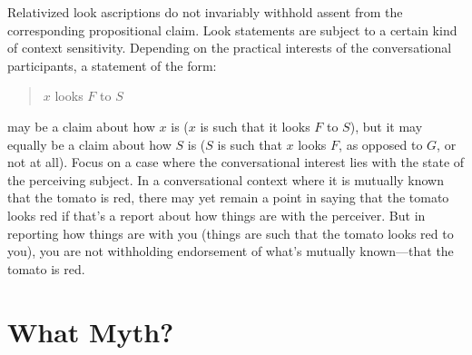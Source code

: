 \documentclass[12pt]{article}
\begin{document}
Relativized look ascriptions do not invariably withhold assent from the corresponding propositional claim. Look statements are subject to a certain kind of context sensitivity. Depending on the practical interests of the conversational participants, a statement of the form:
    \begin{quote}
        \( x \) looks \( F \) to \( S \)
    \end{quote}
    may be a claim about how \( x \) is (\( x \) is such that it looks \( F \) to \( S \)), but it may equally be a claim about how \( S \) is (\( S \) is such that \( x \) looks \( F \), as opposed to \( G \), or not at all). Focus on a case where the conversational interest lies with the state of the perceiving subject. In a conversational context where it is mutually known that the tomato is red, there may yet remain a point in saying that the tomato looks red if that's a report about how things are with the perceiver. But in reporting how things are with you (things are such that the tomato looks red to you), you are not withholding endorsement of what's mutually known---that the tomato is red.


\section{What Myth?} %
\label{sec:what_myth_}


 
 
\end{document}
